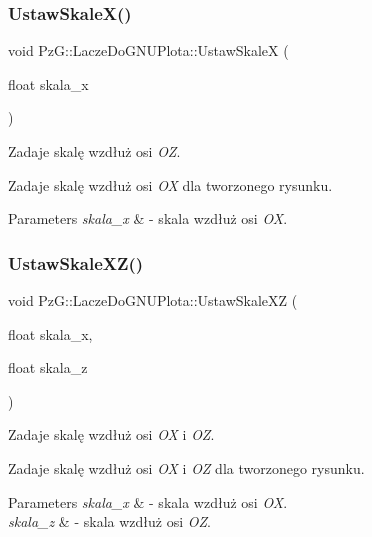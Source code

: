 \subsubsection{\texorpdfstring{Ustaw\+Skale\+X()}{UstawSkaleX()}}
{\footnotesize\ttfamily void Pz\+G\+::\+Lacze\+Do\+G\+N\+U\+Plota\+::\+Ustaw\+SkaleX (\begin{DoxyParamCaption}\item[{float}]{skala\+\_\+x }\end{DoxyParamCaption})\hspace{0.3cm}{\ttfamily [inline]}}



Zadaje skalę wzdłuż osi {\itshape OZ}. 

Zadaje skalę wzdłuż osi {\itshape OX} dla tworzonego rysunku. 
\begin{DoxyParams}{Parameters}
{\em skala\+\_\+x} & -\/ skala wzdłuż osi {\itshape OX}. \\
\hline
\end{DoxyParams}
\mbox{\label{classPzG_1_1LaczeDoGNUPlota_a4308151b54e105d302803146a3238699}} 
\subsubsection{\texorpdfstring{Ustaw\+Skale\+X\+Z()}{UstawSkaleXZ()}}
{\footnotesize\ttfamily void Pz\+G\+::\+Lacze\+Do\+G\+N\+U\+Plota\+::\+Ustaw\+Skale\+XZ (\begin{DoxyParamCaption}\item[{float}]{skala\+\_\+x,  }\item[{float}]{skala\+\_\+z }\end{DoxyParamCaption})\hspace{0.3cm}{\ttfamily [inline]}}



Zadaje skalę wzdłuż osi {\itshape OX} i {\itshape OZ}. 

Zadaje skalę wzdłuż osi {\itshape OX} i {\itshape OZ} dla tworzonego rysunku. 
\begin{DoxyParams}{Parameters}
{\em skala\+\_\+x} & -\/ skala wzdłuż osi {\itshape OX}. \\
\hline
{\em skala\+\_\+z} & -\/ skala wzdłuż osi {\itshape OZ}. \\
\hline
\end{DoxyParams}
\mbox{\label{classPzG_1_1LaczeDoGNUPlota_ab0486db3166d8db6580a221079af241f}} 
